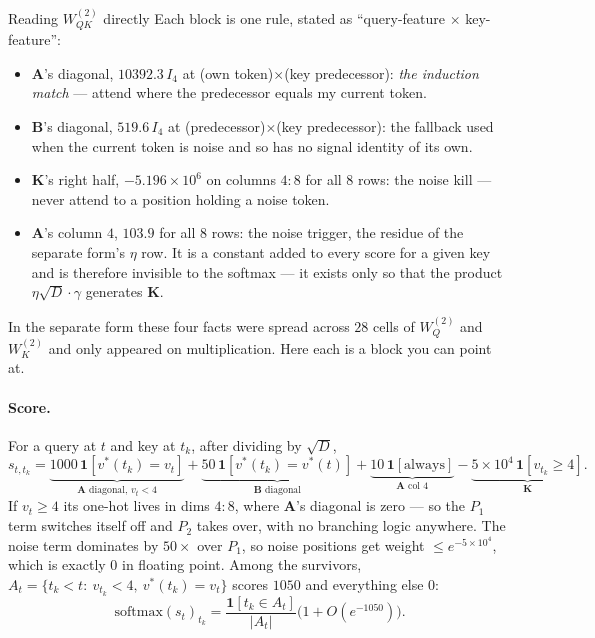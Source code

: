 \documentclass[11pt]{article}
\newcommand{\Wqk}{W_{QK}}
\newcommand{\Wq}{W_Q}
\newcommand{\Wk}{W_K}
\newcommand{\sd}{\sqrt{D}}
\begin{document}
\begin{interpbox}{Reading $\Wqk^{(2)}$ directly}
Each block is one rule, stated as ``query-feature $\times$ key-feature'':
\begin{itemize}\itemsep2pt
\item $\bm{A}$'s diagonal, $10392.3\,I_4$ at (own token)$\times$(key predecessor): \emph{the
induction match} --- attend where the predecessor equals my current token.
\item $\bm{B}$'s diagonal, $519.6\,I_4$ at (predecessor)$\times$(key predecessor): the fallback
used when the current token is noise and so has no signal identity of its own.
\item $\bm{K}$'s right half, $-5.196\times10^{6}$ on columns $4{:}8$ for all $8$ rows: the noise
kill --- never attend to a position holding a noise token.
\item $\bm{A}$'s column $4$, $103.9$ for all $8$ rows: the noise trigger, the residue of the
separate form's $\eta$ row. It is a constant added to every score for a given key and is
therefore invisible to the softmax --- it exists only so that the product $\eta\sd\cdot\gamma$
generates $\bm{K}$.
\end{itemize}
In the separate form these four facts were spread across $28$ cells of $\Wq^{(2)}$ and
$\Wk^{(2)}$ and only appeared on multiplication. Here each is a block you can point at.
\end{interpbox}

\paragraph{Score.} For a query at $t$ and key at $t_k$, after dividing by $\sd$,
\begin{equation}
s_{t,t_k}=\underbrace{1000\,\bm{1}[v^*(t_k)=v_t]}_{\bm{A}\text{ diagonal, }v_t<4}
+\underbrace{50\,\bm{1}[v^*(t_k)=v^*(t)]}_{\bm{B}\text{ diagonal}}
+\underbrace{10\,\bm{1}[\text{always}]}_{\bm{A}\text{ col }4}
-\underbrace{5\times10^{4}\,\bm{1}[v_{t_k}\ge4]}_{\bm{K}} .
\end{equation}
If $v_t\ge4$ its one-hot lives in dims $4{:}8$, where $\bm{A}$'s diagonal is zero --- so the
$P_1$ term switches itself off and $P_2$ takes over, with no branching logic anywhere. The noise
term dominates by $50\times$ over $P_1$, so noise positions get weight $\le e^{-5\times10^4}$,
which is exactly $0$ in floating point. Among the survivors,
$A_t=\{t_k<t:\ v_{t_k}<4,\ v^*(t_k)=v_t\}$ scores $1050$ and everything else $0$:
\begin{equation}
\mathrm{softmax}(s_t)_{t_k}=\frac{\bm{1}[t_k\in A_t]}{|A_t|}\bigl(1+O(e^{-1050})\bigr).
\end{equation}
\end{document}

